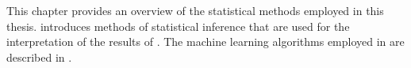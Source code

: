 This chapter provides an overview of the statistical methods employed in this
thesis.  introduces methods of statistical
inference that are used for the interpretation of the results of
. The machine learning algorithms
employed in  are described
in .

